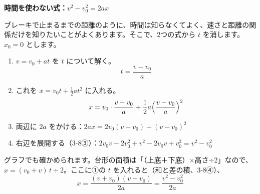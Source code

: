 \noindent\textbf{時間を使わない式：$v^2-v_0^2=2ax$}\par
\noindent\label{ph:力-1:v2}ブレーキで止まるまでの距離のように、時間は知らなくてよく、速さと距離の関係だけを知りたいことがよくあります。そこで、2つの式から $t$ を消します。$x_0=0$ とします。
\begin{enumerate}[label={\bkcircled{\arabic*}}, leftmargin=2.4\zw, itemsep=2pt, topsep=3pt]
\item $v=v_0+at$ を $t$ について解く。
\[ t=\frac{v-v_0}{a} \]
\item これを $x=v_0t+\tfrac{1}{2}at^2$ に入れる。
\[ x=v_0\cdot\frac{v-v_0}{a}+\frac{1}{2}a\Bigl(\frac{v-v_0}{a}\Bigr)^2 \]
\item 両辺に $2a$ をかける：$2ax=2v_0(v-v_0)+(v-v_0)^2$
\item 右辺を展開する（\mbox{3-8③}）：$2v_0v-2v_0^2+v^2-2v_0v+v_0^2=v^2-v_0^2$
\end{enumerate}
グラフでも確かめられます。台形の面積は「（上底＋下底）×高さ÷2」なので、$x=(v_0+v)\,t\div2$。ここに①の $t$ を入れると（和と差の積、\mbox{3-8④}）、
\[ x=\frac{(v+v_0)(v-v_0)}{2a}=\frac{v^2-v_0^2}{2a} \]

